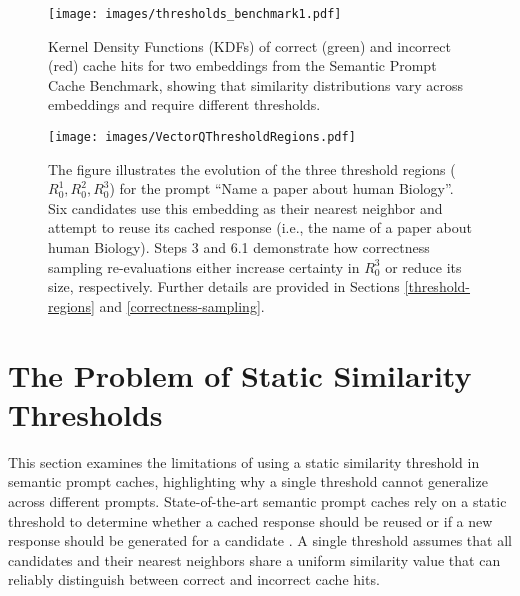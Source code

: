 
\begin{figure}[t]
    \centering
    \texttt{[image: images/thresholds\_benchmark1.pdf]}
    \caption{Kernel Density Functions (KDFs) of correct (green) and incorrect (red) cache hits for two embeddings from the Semantic Prompt Cache Benchmark, showing that similarity distributions vary across embeddings and require different thresholds.}
    \label{fig:one-threshold-problem}
\end{figure}

\begin{figure*}[t]
    \centering
    \texttt{[image: images/VectorQThresholdRegions.pdf]}
    \caption{The figure illustrates the evolution of the three threshold regions ($R_{0}^1, R_{0}^2, R_{0}^3$) for the prompt “Name a paper about human Biology”. Six candidates use this embedding as their nearest neighbor and attempt to reuse its cached response (i.e., the name of a paper about human Biology). Steps 3 and 6.1 demonstrate how correctness sampling re-evaluations either increase certainty in $R_0^3$ or reduce its size, respectively. Further details are provided in Sections \ref{threshold-regions} and \ref{correctness-sampling}.}
    \label{fig:vectorq-threshold-regions}
\end{figure*}

\section{The Problem of Static Similarity Thresholds}
\label{static-similarity-threshold}
This section examines the limitations of using a static similarity threshold in semantic prompt caches, highlighting why a single threshold cannot generalize across different prompts. State-of-the-art semantic prompt caches rely on a static threshold to determine whether a cached response should be reused or if a new response should be generated for a candidate \cite{bang2023gptcache, microsoft, aws, dasgupta2025wallmartcache, li2024scalm}. A single threshold assumes that all candidates and their nearest neighbors share a uniform similarity value that can reliably distinguish between correct and incorrect cache hits.

